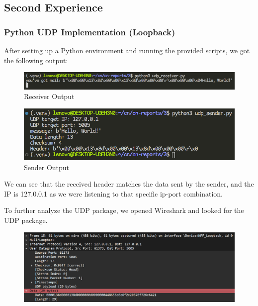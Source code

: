 \subsection{Second Experience}

\subsubsection{Python UDP Implementation (Loopback)}

After setting up a Python environment and running the provided scripts, we got
the following output:

\begin{figure}[htbp]
	\centering
	\includegraphics[width=1\linewidth]{img/second_exp/1.png}
	\caption{Receiver Output}\label{fig:2_1}
\end{figure}

\begin{figure}[htbp]
	\centering
	\includegraphics[width=1\linewidth]{img/second_exp/2.png}
	\caption{Sender Output}\label{fig:2_2}
\end{figure}

We can see that the received header matches the data sent by the sender, and
the IP is 127.0.0.1 as we were listening to that specific ip-port combination.

To further analyze the UDP package, we opened Wireshark and looked for the UDP
package.

\begin{figure}[htbp]
	\centering
	\includegraphics[width=1\linewidth]{img/second_exp/3.png}
	\caption{}\label{fig:2_3}
\end{figure}

